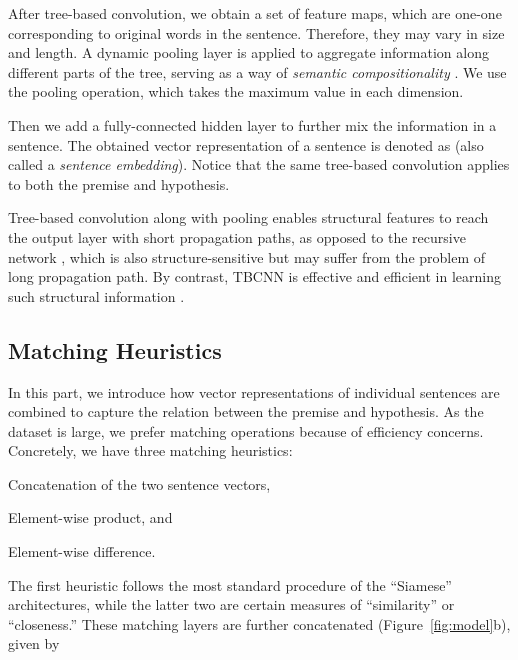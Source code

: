 \documentclass[11pt]{article}
\begin{document}
 After tree-based convolution, we obtain a set of feature maps, which are one-one corresponding to original words in the sentence. Therefore, they may vary in size and length. A dynamic pooling layer is applied to aggregate information along different parts of the tree, serving as a way of \textit{semantic compositionality} \cite{CNN:NIPS}. We use the  pooling operation, which takes the maximum value in each dimension. 


Then we add a fully-connected hidden layer to further mix the information in a sentence. The obtained vector representation of a sentence is denoted as  (also called a \textit{sentence embedding}). Notice that the same tree-based convolution applies to both the  premise and hypothesis.

Tree-based convolution along with pooling enables structural features to reach the output layer with short propagation paths, as opposed to the recursive network \cite{recursive}, which is also structure-sensitive but may suffer from the problem of long propagation path. By contrast, TBCNN is effective and efficient in learning such structural information \cite{sentenceTBCNN}.


\subsection{Matching Heuristics}\label{ss:matching}

\vspace{-.1cm}
In this part, we introduce how vector representations of individual sentences are combined to capture the relation between the premise and hypothesis. As the dataset is large, we prefer  matching operations because of efficiency concerns.  Concretely, we have three matching heuristics:
\begin{compactitem}
\item Concatenation of the two sentence vectors,
\item Element-wise product, and
\item Element-wise difference.
\end{compactitem}
The first heuristic follows the most standard procedure of the ``Siamese'' architectures, while the latter two are certain measures of ``similarity'' or ``closeness.''
These matching layers are further concatenated (Figure~\ref{fig:model}b), given by 

\vspace{-.3cm plus 0cm minus 0cm}

\vspace{-.5cm plus 0cm minus 0cm}
\end{document}

